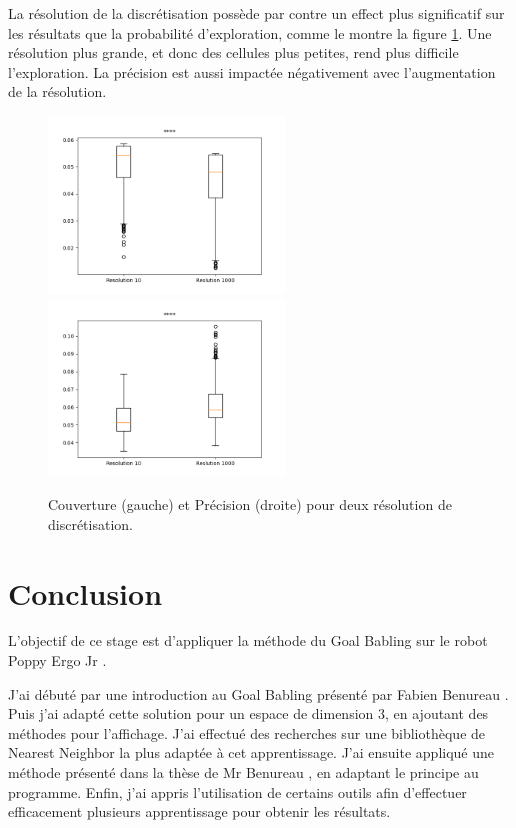 \documentclass[11pt,french]{report}
\begin{document}
La résolution de la discrétisation possède par contre un effect plus significatif sur les résultats que la probabilité d'exploration, comme le montre la figure \ref{fig:effet_res}.
Une résolution plus grande, et donc des cellules plus petites, rend plus difficile l'exploration.
La précision est aussi impactée négativement avec l'augmentation de la résolution.

\begin{figure}[h]
    \centering
    \includegraphics[width=178pt]{Fro_10-1kres_couver.png} \includegraphics[width=178pt]{Fro_10-1kres_moy_gl.png}
    \caption{Couverture (gauche) et Précision (droite) pour deux résolution de discrétisation.}
    \label{fig:effet_res}
\end{figure}

\chapter{Conclusion}

L'objectif de ce stage est d'appliquer la méthode du Goal Babling \cite{GoalBabling} sur le robot Poppy Ergo Jr \cite{PoppyErgoJr}.

J'ai débuté par une introduction au Goal Babling présenté par Fabien Benureau \cite{TutoGoalBabling}.
Puis j'ai adapté cette solution pour un espace de dimension 3, en ajoutant des méthodes pour l'affichage.
J'ai effectué des recherches sur une bibliothèque de Nearest Neighbor la plus adaptée à cet apprentissage.
J'ai ensuite appliqué une méthode présenté dans la thèse de Mr Benureau \cite{TheseBenureau}, en adaptant le principe au programme.
Enfin, j'ai appris l'utilisation de certains outils afin d'effectuer efficacement plusieurs apprentissage pour obtenir les résultats.
\end{document}
